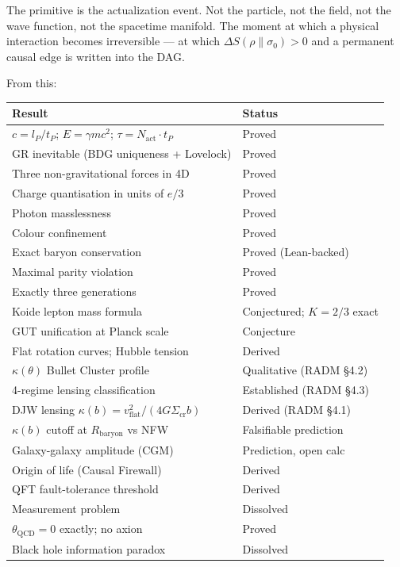 \documentclass[11pt,a4paper]{article}
\begin{document}
The primitive is the actualization event. Not the particle, not
the field, not the wave function, not the spacetime manifold.
The moment at which a physical interaction becomes irreversible ---
at which $\Delta S(\rho\|\sigma_0) > 0$ and a permanent causal edge
is written into the DAG.

From this:

\medskip
\begin{center}
\renewcommand{\arraystretch}{1.2}
\begin{tabular}{ll}
\toprule
Result & Status \\
\midrule
$c = l_P/t_P$; $E = \gamma mc^2$; $\tau = N_{\mathrm{act}}\cdot t_P$ & Proved \\
GR inevitable (BDG uniqueness + Lovelock) & Proved \\
Three non-gravitational forces in 4D & Proved \\
Charge quantisation in units of $e/3$ & Proved \\
Photon masslessness & Proved \\
Colour confinement & Proved \\
Exact baryon conservation & Proved (Lean-backed) \\
Maximal parity violation & Proved \\
Exactly three generations & Proved \\
Koide lepton mass formula & Conjectured; $K = 2/3$ exact \\
GUT unification at Planck scale & Conjecture \\
Flat rotation curves; Hubble tension & Derived \\
$\kappa(\theta)$ Bullet Cluster profile & Qualitative (RADM §4.2) \\
4-regime lensing classification & Established (RADM §4.3) \\
DJW lensing $\kappa(b) = v_\mathrm{flat}^2/(4G\Sigma_\mathrm{cr}b)$ & Derived (RADM §4.1) \\
$\kappa(b)$ cutoff at $R_\mathrm{baryon}$ vs NFW & Falsifiable prediction \\
Galaxy-galaxy amplitude (CGM) & Prediction, open calc \\
Origin of life (Causal Firewall) & Derived \\
QFT fault-tolerance threshold & Derived \\
Measurement problem & Dissolved \\
$\theta_{\mathrm{QCD}} = 0$ exactly; no axion & Proved \\
Black hole information paradox & Dissolved \\

\end{tabular}
\end{center}
\end{document}

